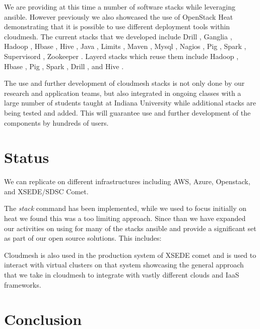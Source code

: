 We are providing at this time a number of software stacks while
leveraging ansible. However previously we also showcased the use of
OpenStack Heat demonstrating that it is possible to use different
deployment tools within cloudmesh.  The current stacks that we
developed include Drill \cite{??}, Ganglia \cite{??}, Hadoop
\cite{??}, Hbase \cite{??}, Hive \cite{??}, Java \cite{??}, Limits
\cite{??}, Maven \cite{??}, Mysql \cite{??}, Nagios \cite{??}, Pig
\cite{??}, Spark \cite{??}, Supervisord \cite{??}, Zookeeper
\cite{??}. Layerd stacks which reuse them include Hadoop \cite{??},
Hbase \cite{??}, Pig \cite{??}, Spark \cite{??}, Drill \cite{??}, and
Hive \cite{??}.

The use and further development of cloudmesh stacks is not only done
by our research and application teams, but also integrated in ongoing
classes with a large number of students taught at Indiana University
while additional stacks are being tested and added. This will guarantee 
use and further development of the components by hundreds of users.



\section{Status}


We can replicate on different infrastructures including AWS, Azure,
Openstack, and XSEDE/SDSC Comet.

The {\it stack} command has been implemented, while we used to focus initially
on heat we found thia was a too limiting approach. Since than we have
expanded our activities on using for many of the stacks ansible and
provide a significant set as part of our open source solutions. This
includes:


Cloudmesh is also used in the production system of XSEDE comet and is
used to interact with virtual clusters on that system showcasing the
general approach that we take in cloudmesh to integrate with vastly
different clouds and IaaS frameworks.

\section{Conclusion}\label{S:conclusion}

